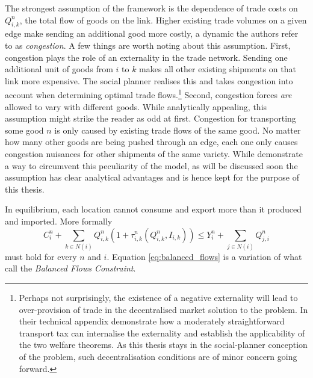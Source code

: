 \documentclass[11pt, oneside]{article}   	%
\begin{document}
The strongest assumption of the \citeauthor{fajgelbaum_optimal_2017} framework is the dependence of trade costs on $Q_{i,k}^{n}$, the total flow of goods on the link. Higher existing trade volumes on a given edge make sending an additional good more costly, a dynamic the authors refer to as \emph{congestion}. A few things are worth noting about this assumption. First, congestion plays the role of an externality in the trade network. Sending one additional unit of goods from $i$ to $k$ makes all other existing shipments on that link more expensive. The social planner realises this and takes congestion into account when determining optimal trade flows.\footnote{Perhaps not surprisingly, the existence of a negative externality will lead to over-provision of trade in the decentralised market solution to the problem. In their technical appendix \citeauthor{fajgelbaum_optimal_2017} demonstrate how a moderately straightforward transport tax can internalise the externality and establish the applicability of the two welfare theorems. As this thesis stays in the social-planner conception of the problem, such decentralisation conditions are of minor concern going forward.} Second, congestion forces \emph{are} allowed to vary with different goods. While analytically appealing, this assumption might strike the reader as odd at first. Congestion for transporting some good $n$ is only caused by existing trade flows of the same good. No matter how many other goods are being pushed through an edge, each one only causes congestion nuisances for other shipments of the same variety. While \citeauthor{fajgelbaum_optimal_2017} demonstrate a way to circumvent this peculiarity of the model, as will be discussed soon the assumption has clear analytical advantages and is hence kept for the purpose of this thesis.

In equilibrium, each location cannot consume and export more than it produced and imported. More formally
\begin{equation}
  C_{i}^{n} + \sum_{k\in N(i)}^{}Q_{i,k}^{n}(1+\tau_{i,k}^{n}(Q_{i,k}^{n}, I_{i,k})) \leq Y_{i}^{n} + \sum_{j\in N(i)}^{}Q_{j,i}^{n}
  \label{eq:balanced_flows}
\end{equation}
must hold for every $n$ and $i$. Equation \eqref{eq:balanced_flows} is a variation of what \citeauthor{fajgelbaum_optimal_2017} call the \emph{Balanced Flows Constraint}.
\end{document}
